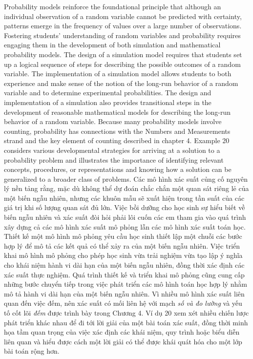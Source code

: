 \documentclass[
  10pt,
  a4paper,
  landscape,
  twoside,
  openany
]{scrbook}
\newcommand{\EN}[1]{#1}
\newcommand{\VI}[1]{#1}
\newcommand{\NOTE}[1]{#1}
\begin{document}
\TriPara
{
\EN{Probability models reinforce the foundational principle that although an individual observation of a random variable cannot be predicted with certainty, patterns emerge in the frequency of values over a large number of observations. Fostering students' understanding of random variables and probability requires engaging them in the development of both simulation and mathematical probability models. The design of a simulation model requires that students set up a logical sequence of steps for describing the possible outcomes of a random variable. The implementation of a simulation model allows students to both experience and make sense of the notion of the long-run behavior of a random variable and to determine experimental probabilities. The design and implementation of a simulation also provides transitional steps in the development of reasonable mathematical models for describing the long-run behavior of a random variable. Because many probability models involve counting, probability has connections with the Numbers and Measurements strand and the key element of counting described in chapter 4. Example 20 considers various developmental strategies for arriving at a solution to a probability problem and illustrates the importance of identifying relevant concepts, procedures, or representations and knowing how a solution can be generalized to a broader class of problems.}
}
{
\VI{Các mô hình xác suất củng cố nguyên lý nền tảng rằng, mặc dù không thể dự đoán chắc chắn một quan sát riêng lẻ của một biến ngẫu nhiên, nhưng các khuôn mẫu sẽ xuất hiện trong tần suất của các giá trị khi số lượng quan sát đủ lớn. Việc bồi dưỡng cho học sinh sự hiểu biết về biến ngẫu nhiên và xác suất đòi hỏi phải lôi cuốn các em tham gia vào quá trình xây dựng cả các mô hình xác suất mô phỏng lẫn các mô hình xác suất toán học. Thiết kế một mô hình mô phỏng yêu cầu học sinh thiết lập một chuỗi các bước hợp lý để mô tả các kết quả có thể xảy ra của một biến ngẫu nhiên. Việc triển khai mô hình mô phỏng cho phép học sinh vừa trải nghiệm vừa tạo lập ý nghĩa cho khái niệm hành vi dài hạn của một biến ngẫu nhiên, đồng thời xác định các xác suất thực nghiệm. Quá trình thiết kế và triển khai mô phỏng cũng cung cấp những bước chuyển tiếp trong việc phát triển các mô hình toán học hợp lý nhằm mô tả hành vi dài hạn của một biến ngẫu nhiên. Vì nhiều mô hình xác suất liên quan đến việc đếm, nên xác suất có mối liên hệ với mạch \emph{số và đo lường} và yếu tố cốt lõi \emph{đếm} được trình bày trong Chương 4. Ví dụ 20 xem xét nhiều chiến lược phát triển khác nhau để đi tới lời giải của một bài toán xác suất, đồng thời minh họa tầm quan trọng của việc xác định các khái niệm, quy trình hoặc biểu diễn liên quan và hiểu được cách một lời giải có thể được khái quát hóa cho một lớp bài toán rộng hơn.}
}
{
\NOTE{}
}
\end{document}
